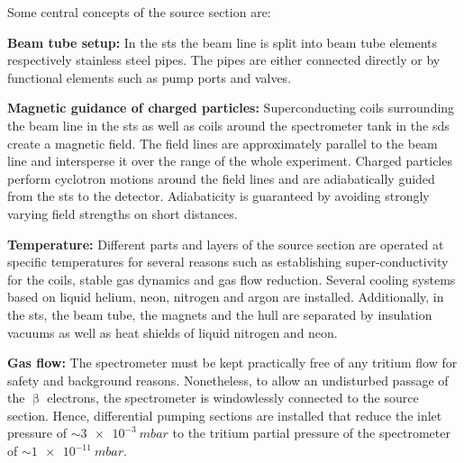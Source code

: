 Some central concepts of the source section are:
{\par \textbf{Beam tube setup:} In the \gls{sts} the beam line is split into beam tube elements respectively stainless steel pipes. The pipes are either connected directly or by functional elements such as pump ports and valves.}

{\par \textbf{Magnetic guidance of charged particles:} Superconducting coils surrounding the beam line in the \gls{sts} as well as coils around the spectrometer tank in the \gls{sds} create a magnetic field. The field lines are approximately parallel to the beam line and intersperse it over the range of the whole experiment. Charged particles perform cyclotron motions around the field lines and are adiabatically guided from the \gls{sts} to the detector. Adiabaticity is guaranteed by avoiding strongly varying field strengths on short distances.}

{\par \textbf{Temperature:} Different parts and layers of the source section are operated at specific temperatures for several reasons such as establishing super-conductivity for the coils, stable gas dynamics and gas flow reduction. Several cooling systems based on liquid helium, neon, nitrogen and argon are installed. Additionally, in the \gls{sts}, the beam tube, the magnets and the hull are separated by insulation vacuums as well as heat shields of liquid nitrogen and neon.}

{\par \textbf{Gas flow:} The spectrometer must be kept practically free of any tritium flow for safety and background reasons. Nonetheless, to allow an undisturbed passage of the $\upbeta$ electrons, the spectrometer is windowlessly connected to the source section. Hence, differential pumping sections are installed that reduce the inlet pressure of $\sim\SI{3e-3}{mbar}$ to the tritium partial pressure of the spectrometer of $\sim\SI{1e-11}{mbar}$.}

